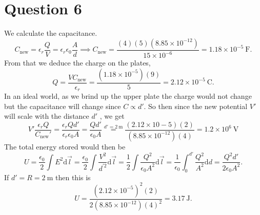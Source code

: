 \documentclass[12pt]{article}
\newcommand{\ep}{\epsilon}
\newcommand{\dr}{\mathrm{d}}
\theoremstyle{definition}
\theoremstyle{definition}
\theoremstyle{definition}
\theoremstyle{definition}
\theoremstyle{definition}
\theoremstyle{example}
\theoremstyle{note}
\theoremstyle{remark}
\theoremstyle{example}
\begin{document}
		\section*{Question 6}
		We calculate the capacitance.
			$$ C_{\text{new}} = \ep_{r} \frac{Q}{V} = \ep_{r} \ep_{0} \frac{A}{d} \implies C_{\text{new}} = \frac{(4)(5)(8.85\times 10^{-12})}{15 \times 10^{-6}} = 1.18 \times 10^{-5} \ \si{\farad}.$$
		From that we deduce the charge on the plates, 
		$$ Q = \frac{V C_{\text{new}}}{\ep_{r}} = \frac{(1.18 \times 10^{-5})(9)}{5} = 2.12  \times 10^{-5} \ \si{\coulomb}.$$
		In an ideal world, as we brind up the upper plate the charge would not change but the capacitance will change since $C \propto d'$. So then since the new potential $V'$ will scale with the distance $d'$ , we get 
		$$ V ' \frac{\ep_{r} Q}{C_{\text{new}} ' } = \frac{\ep_{r} Q d' }{\ep_{r} \ep_{0} A} = \frac{Q d' }{\ep_{0} A} \overset{d' = 2 \ \si{\meter}}{=} \frac{(2.12\times 10-5)(2)}{(8.85 \times 10^{-12})(4)} = 1.2 \times 10^{6} \ \si{\volt}$$
		The total energy stored would then be 
		$$ U = \frac{\ep_{0}}{2} \int  E^{2} \dr \vec{l}= \frac{\ep_{0}}{2} \int \frac{V^{2}}{d^{'2}} \dr \vec{l} = \frac12 \int \frac{Q^{2}}{\ep_{0} A^{2}} \dr \vec{l } = \frac{1}{\ep_{0}}\int_{0}^{d'} \frac{Q^{2}}{A^{2}} \dr d = \frac{Q^{2} d'}{2 \ep_{0} A^{2}}.$$
		If $d' = R = 2 \ \si{\meter}$ then this is 
		$$ U  = \frac{(2.12\times 10^{-5})^{2} (2)}{2(8.85\times 10^{-12})(4)^{2}} = 3.17 \ \si{\joule}. $$
 			
\end{document}
